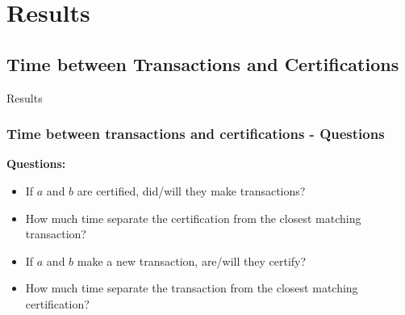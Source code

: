 \documentclass{beamer}
\begin{document}
\section{Results}

\subsection{Time between Transactions and Certifications}

\begin{frame}
	\Huge{\centerline{Results}}
\end{frame}


\begin{frame}
	\frametitle{Time between transactions and certifications - \textbf{Questions}}
	{\Large \textbf{Questions:}}
	\bigskip
	\begin{itemize}
		\item<1-> If $a$ and $b$ are certified, did/will they make transactions? 
		\medskip
		\item<2-> How much time separate the certification from the closest matching transaction?
		\medskip
		\item<3-> If $a$ and $b$ make a new transaction, are/will they certify?
		\medskip
		\item<4-> How much time separate the transaction from the closest matching certification?
	\end{itemize}
\end{frame}


\end{document}
